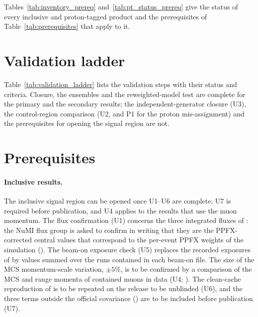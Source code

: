 Tables~\ref{tab:inventory_prereq} and~\ref{tab:pt_status_prereq} give the status of every inclusive and
proton-tagged product and the prerequisites of Table~\ref{tab:prerequisites} that apply to it.





\section{Validation ladder}
\label{sec:ar_ladder}

Table~\ref{tab:validation_ladder} lists the validation steps with their status and criteria. Closure, the
ensembles and the reweighted-model test are complete for the primary and the secondary results; the
independent-generator closure (U3), the control-region comparison (U2, and P1 for the proton
mis-assignment) and the prerequisites for opening the signal region are not.



\section{Prerequisites}
\label{sec:ar_prereq}

\paragraph{Inclusive results.} The inclusive signal region can be opened once U1--U6 are complete; U7 is
required before publication, and U4 applies to the results that use the muon momentum. The flux
confirmation (U1) concerns the three integrated fluxes of : the NuMI flux group
is asked to confirm in writing that they are the PPFX-corrected central values that correspond to the
per-event PPFX weights of the simulation (). The beam-on exposure check
(U5) replaces the recorded exposures of  by values summed over the runs contained
in each beam-on file. The size of the MCS momentum-scale variation, $\pm5\%$, is to be confirmed by a
comparison of the MCS and range momenta of contained muons in data (U4; ). The
clean-cache reproduction of  is to be repeated on the release to be unblinded
(U6), and the three terms outside the official covariance () are to be
included before publication (U7).

